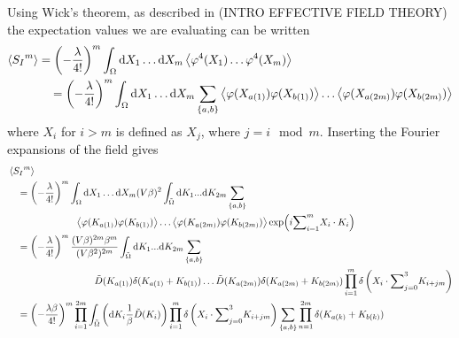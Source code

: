 Using Wick's theorem, as described in (INTRO EFFECTIVE FIELD THEORY) the expectation values we are evaluating can be written
\begin{align*}
    \ex{{S_I}^m} & 
    = \left(- \frac{\lambda }{4!}\right)^m 
    \int_{\Omega} \dd X_1 \dots \dd X_m
    \ex{\varphi^4(X_1) \dots \varphi^4(X_m)} \\ 
    & \quad
    = \left(- \frac{\lambda }{4!}\right)^m 
    \int_{\Omega} \dd X_1 \dots \dd X_m \sum_{\{a, b\}}
    \ex{\varphi(X_{a(1)}) \varphi(X_{b(1)})} 
    \dots
    \ex{\varphi(X_{a(2m)}) \varphi(X_{b(2m)})}
\end{align*}
where $X_i$ for $i>m$ is defined as $X_j$, where $j = i \mod m$.
Inserting the Fourier expansions of the field gives
\begin{align*}
    & \ex{{S_I}^m} \\ 
    &\quad 
    = \left(-\frac{\lambda }{4!}\right)^m 
    \int_{\Omega} \dd X_1 \dots \dd X_m
    (V \beta)^2 \int_{\tilde \Omega} \dd K_1 ... \dd K_{2m} \sum_{\{a, b\}} \\
    & \quad \quad \quad \quad\quad \quad \quad
    \ex{\varphi(K_{a(1)}) \varphi(K_{b(1)})} 
    \dots
    \ex{\varphi(K_{a(2m)}) \varphi(K_{b(2m)})}     
    \exp(i {\sum}_{i=1}^{m} X_i \cdot K_i)\\ 
    & \quad  
    = \left(-\frac{\lambda }{4!}\right)^m 
    \frac{(V \beta)^{2m} \beta^m}{(V \beta^2)^{2m}}
    \int_{\tilde \Omega} \dd K_1 ... \dd K_{2m} \sum_{\{a, b\}} \\
    & \quad \quad \quad \quad \quad \quad \quad \quad \quad
    \tilde D(K_{a(1)}) \delta(K_{a(1)} + K_{b(1)}) \dots 
    \tilde D(K_{a(2m)}) \delta(K_{a(2m)} + K_{b(2m)})
    \prod_{i=1}^m \delta\left(X_i \cdot {\sum}_{j=0}^3 K_{i + jm}\right) \\
    & \quad 
    = \left(-\frac{\lambda \beta}{4!}\right)^m 
    \prod_{i=1}^{2m} \int_{\tilde \Omega} 
    \left( \dd K_i \frac{1}{\beta} \tilde D(K_i)  \right) 
    \prod_{i=1}^m \delta\left(X_i \cdot {\sum}_{j=0}^3 K_{i + jm}\right)
    \sum_{\{a, b\}} 
    \prod_{n=1}^{2m}\delta(K_{a(k)} + K_{b(k)})
\end{align*}
